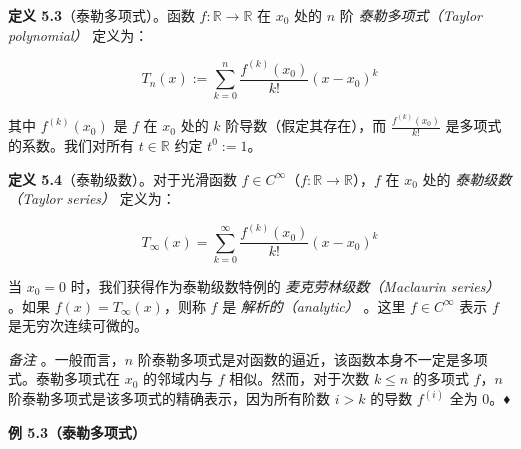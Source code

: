 \textbf{定义 5.3}（泰勒多项式）。函数 $ f : \mathbb{R} \to \mathbb{R} $ 在 $ x_0 $ 处的 $ n $ 阶 \emph{泰勒多项式（Taylor polynomial）} 定义为：

\begin{equation}
T_n(x) := \sum_{k=0}^n \frac{f^{(k)}(x_0)}{k!} (x - x_0)^k
\tag{5.7}\label{eq:5-7}
\end{equation}

其中 $ f^{(k)}(x_0) $ 是 $ f $ 在 $ x_0 $ 处的 $ k $ 阶导数（假定其存在），而 $ \frac{f^{(k)}(x_0)}{k!} $ 是多项式的系数。我们对所有 $ t \in \mathbb{R} $ 约定 $ t^0 := 1 $。

\textbf{定义 5.4}（泰勒级数）。对于光滑函数 $ f \in C^\infty $（$ f : \mathbb{R} \to \mathbb{R} $），$ f $ 在 $ x_0 $ 处的 \emph{泰勒级数（Taylor series）} 定义为：

\begin{equation}
T_\infty(x) = \sum_{k=0}^\infty \frac{f^{(k)}(x_0)}{k!} (x - x_0)^k
\tag{5.8}\label{eq:5-8}
\end{equation}

当 $ x_0 = 0 $ 时，我们获得作为泰勒级数特例的 \emph{麦克劳林级数（Maclaurin series）} 。如果 $ f(x) = T_\infty(x) $，则称 $ f $ 是 \emph{解析的（analytic）} 。这里 $ f \in C^\infty $ 表示 $ f $ 是无穷次连续可微的。

\emph{备注} 。一般而言，$ n $ 阶泰勒多项式是对函数的逼近，该函数本身不一定是多项式。泰勒多项式在 $ x_0 $ 的邻域内与 $ f $ 相似。然而，对于次数 $ k \leqslant n $ 的多项式 $ f $，$ n $ 阶泰勒多项式是该多项式的精确表示，因为所有阶数 $ i > k $ 的导数 $ f^{(i)} $ 全为 0。♦

\begin{notebox}
\textbf{例 5.3（泰勒多项式）}
\end{notebox}

